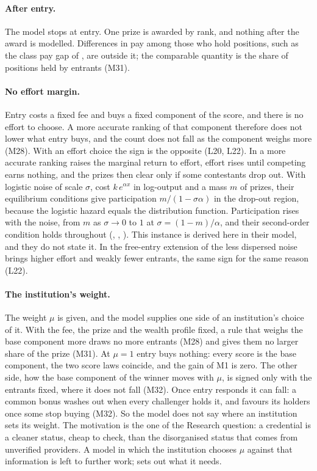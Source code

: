\paragraph{After entry.} The model stops at entry. One prize is awarded by
rank, and nothing after the award is modelled. Differences in pay among those
who hold positions, such as the class pay gap of \citet{LaurisonFriedman2016},
are outside it; the comparable quantity is the share of positions held by
entrants (M31).

\paragraph{No effort margin.} Entry costs a fixed fee and buys a fixed
component of the score, and there is no effort to choose. A more accurate
ranking of that component therefore does not lower what entry buys, and the
count does not fall as the component weighs more (M28). With an effort choice
the sign is the opposite (L20, L22). In \citet{MorganTumlinsonVardy2022} a more
accurate ranking raises the marginal return to effort, effort rises until
competing earns nothing, and the prizes then clear only if some contestants
drop out. With logistic noise of scale $\sigma$, cost $k\,e^{\alpha x}$ in
log-output and a mass $m$ of prizes, their equilibrium conditions give
participation $m/(1-\sigma\alpha)$ in the drop-out region, because the
logistic hazard equals the distribution function. Participation rises with
the noise, from $m$ as $\sigma\to0$ to $1$ at $\sigma=(1-m)/\alpha$, and their
second-order condition holds throughout
(,
,
). This instance is derived here in their
model, and they do not state it. In the free-entry extension of
\citet{DrugovRyvkin2020a} the less dispersed noise brings higher effort and
weakly fewer entrants, the same sign for the same reason (L22).

\paragraph{The institution's weight.} The weight $\mu$ is given, and the
model supplies one side of an institution's choice of it. With the fee, the
prize and the wealth profile fixed, a rule that weighs the base component more
draws no more entrants (M28) and gives them no larger share of the prize (M31).
At $\mu=1$ entry buys nothing: every score is the base component, the two score
laws coincide, and the gain of M1 is zero. The other side, how the base
component of the winner moves with $\mu$, is signed only with the entrants
fixed, where it does not fall (M32). Once entry responds it can fall: a common
bonus washes out when every challenger holds it, and favours its holders once
some stop buying (M32). So the model does not say where an institution sets its
weight. The motivation is the one of the
Research question: a credential is a cleaner status, cheap to check, than the
disorganised status that comes from unverified providers. A
model in which the institution chooses $\mu$ against that information is left
to further work;  sets out what it needs.

